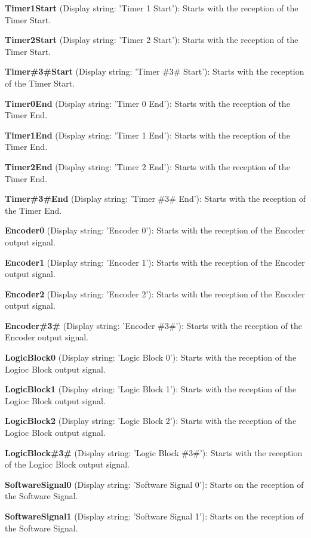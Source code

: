 \begin{DoxyItemize}
\item {\bfseries Timer1\+Start} (Display string\+: 'Timer 1 Start')\+: Starts with the reception of the Timer Start.
\item {\bfseries Timer2\+Start} (Display string\+: 'Timer 2 Start')\+: Starts with the reception of the Timer Start.
\item {\bfseries Timer\#3\#Start} (Display string\+: 'Timer \#3\# Start')\+: Starts with the reception of the Timer Start.
\item {\bfseries Timer0\+End} (Display string\+: 'Timer 0 End')\+: Starts with the reception of the Timer End.
\item {\bfseries Timer1\+End} (Display string\+: 'Timer 1 End')\+: Starts with the reception of the Timer End.
\item {\bfseries Timer2\+End} (Display string\+: 'Timer 2 End')\+: Starts with the reception of the Timer End.
\item {\bfseries Timer\#3\#End} (Display string\+: 'Timer \#3\# End')\+: Starts with the reception of the Timer End.
\item {\bfseries Encoder0} (Display string\+: 'Encoder 0')\+: Starts with the reception of the Encoder output signal.
\item {\bfseries Encoder1} (Display string\+: 'Encoder 1')\+: Starts with the reception of the Encoder output signal.
\item {\bfseries Encoder2} (Display string\+: 'Encoder 2')\+: Starts with the reception of the Encoder output signal.
\item {\bfseries Encoder\#3\#} (Display string\+: 'Encoder \#3\#')\+: Starts with the reception of the Encoder output signal.
\item {\bfseries Logic\+Block0} (Display string\+: 'Logic Block 0')\+: Starts with the reception of the Logioc Block output signal.
\item {\bfseries Logic\+Block1} (Display string\+: 'Logic Block 1')\+: Starts with the reception of the Logioc Block output signal.
\item {\bfseries Logic\+Block2} (Display string\+: 'Logic Block 2')\+: Starts with the reception of the Logioc Block output signal.
\item {\bfseries Logic\+Block\#3\#} (Display string\+: 'Logic Block \#3\#')\+: Starts with the reception of the Logioc Block output signal.
\item {\bfseries Software\+Signal0} (Display string\+: 'Software Signal 0')\+: Starts on the reception of the Software Signal.
\item {\bfseries Software\+Signal1} (Display string\+: 'Software Signal 1')\+: Starts on the reception of the Software Signal.

\end{DoxyItemize}
